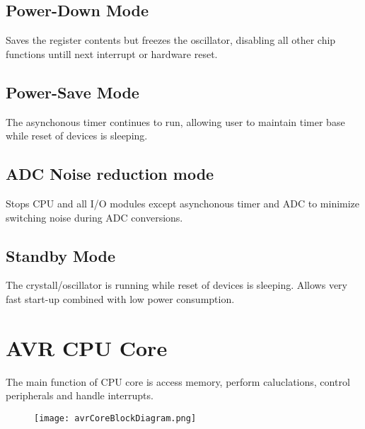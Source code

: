 \documentclass{article}
\begin{document}
\subsection{Power-Down Mode}
\quad Saves the register contents but freezes the oscillator, disabling all other chip functions untill next interrupt or hardware reset.

\subsection{Power-Save Mode}
\quad The asynchonous timer continues to run, allowing user to maintain timer base while reset of devices is sleeping.

\subsection{ADC Noise reduction mode}
\quad Stops CPU and all I/O modules except asynchonous timer and ADC to minimize switching noise during ADC conversions.

\subsection{Standby Mode}
\quad The crystall/oscillator is running while reset of devices is sleeping. Allows very fast start-up combined with low power consumption.


\section{AVR CPU Core}
\quad The main function of CPU core is access memory, perform caluclations, control peripherals and handle interrupts.

\begin{figure}[H]
    \centering
    \texttt{[image: avrCoreBlockDiagram.png]}
\end{figure}
\end{document}
